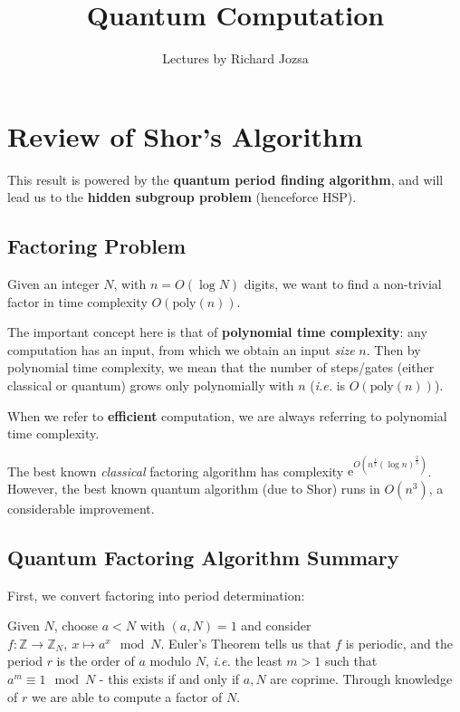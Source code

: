 \documentclass[]{article}
\title{Quantum Computation}
\author{Lectures by Richard Jozsa}
\date{}
\theoremstyle{custhm}
\theoremstyle{cusdef}
\theoremstyle{custhm}
\theoremstyle{custhm}
\theoremstyle{custhm}
\theoremstyle{custhm}
\theoremstyle{cusdef}
\theoremstyle{remark}
\newcommand{\Z}{\mathbb{Z}}
\newcommand{\e}{\mathrm{e}}
\newcommand{\ra}{\rightarrow}
\newcommand{\lef}{\left(}
\newcommand{\res}{\right)}
\newcommand{\ie}{\textit{i.e. }}
\begin{document}
\maketitle

\tableofcontents
\clearpage
{}
\section{Review of Shor's Algorithm}

This result is powered by the \textbf{quantum period finding algorithm}, and will lead us to the \textbf{hidden subgroup problem} (henceforce HSP).

\subsection{Factoring Problem}

Given an integer $N$, with $n = O(\log N)$ digits, we want to find a non-trivial factor in time complexity $O(\textrm{poly}(n))$.

The important concept here is that of \textbf{polynomial time complexity}: any computation has an input, from which we obtain an input \textit{size} $n$. Then by polynomial time complexity, we mean that the number of steps/gates (either classical or quantum) grows only polynomially with $n$ (\textit{i.e.} is $O(\textrm{poly}(n))$).

When we refer to \textbf{efficient} computation, we are always referring to polynomial time complexity.

The best known \textit{classical} factoring algorithm has complexity $\e^{O\lef n^{\frac{1}{3}}(\log n)^{\frac{2}{3}}\res}$. However, the best known quantum algorithm (due to Shor) runs in $O(n^3)$, a considerable improvement.

\subsection{Quantum Factoring Algorithm Summary}

First, we convert factoring into period determination:

Given $N$, choose $a<N$ with $(a,N) = 1$ and consider $f:\Z \ra \Z_N,\ x\mapsto a^x \mod N$. Euler's Theorem tells us that $f$ is periodic, and the period $r$ is the order of $a$ modulo $N$, \ie the least $m > 1$ such that $a^m \equiv 1 \mod N$ - this exists if and only if $a,N$ are coprime. Through knowledge of $r$ we are able to compute a factor of $N$.
\end{document}
